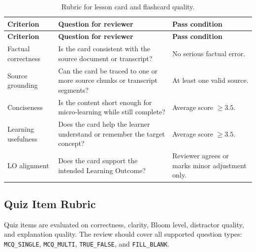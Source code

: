 \begin{longtable}{|p{3.7cm}|p{6.7cm}|p{3.1cm}|}
    \caption{Rubric for lesson card and flashcard quality.}
    \label{tab:card-rubric} \\
    \hline
    \textbf{Criterion} & \textbf{Question for reviewer} & \textbf{Pass condition} \\
    \hline
    \endfirsthead
    \hline
    \textbf{Criterion} & \textbf{Question for reviewer} & \textbf{Pass condition} \\
    \hline
    \endhead

    Factual correctness
        & Is the card consistent with the source document or transcript?
        & No serious factual error. \\
    \hline

    Source grounding
        & Can the card be traced to one or more source chunks or transcript
          segments?
        & At least one valid source. \\
    \hline

    Conciseness
        & Is the content short enough for micro-learning while still complete?
        & Average score $\geq 3.5$. \\
    \hline

    Learning usefulness
        & Does the card help the learner understand or remember the target
          concept?
        & Average score $\geq 3.5$. \\
    \hline

    LO alignment
        & Does the card support the intended Learning Outcome?
        & Reviewer agrees or marks minor adjustment only. \\
    \hline
\end{longtable}

\subsection{Quiz Item Rubric}

Quiz items are evaluated on correctness, clarity, Bloom level, distractor
quality, and explanation quality. The review should cover all supported
question types: \texttt{MCQ\_SINGLE}, \texttt{MCQ\_MULTI},
\texttt{TRUE\_FALSE}, and \texttt{FILL\_BLANK}.

